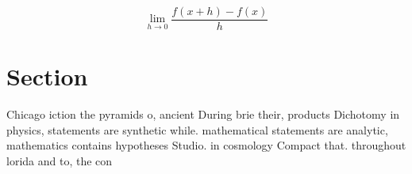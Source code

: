 \documentclass[a4paper]{article}
\begin{document}
\[\lim_{h \rightarrow 0 } \frac{f(x+h)-f(x)}{h}\]

\section{Section}

Chicago iction the pyramids o, ancient During brie their, products Dichotomy in physics, statements are synthetic while. mathematical statements are analytic, mathematics contains hypotheses Studio. in cosmology Compact that. throughout lorida and to, the con
\end{document}
